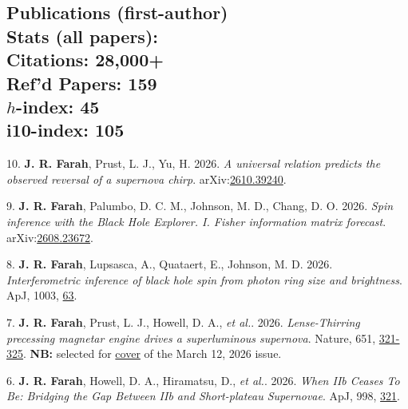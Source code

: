 \documentclass[margin,line]{res}
\newcommand{\statcites}{28{,}000+}
\newcommand{\statrefd}{159}
\newcommand{\stath}{45}
\newcommand{\stati}{105}
\begin{document}
\begin{resume}
\vspace{+.8cm}
\section{{\sc Publications (first-author)  \\ \vspace{0.3cm} {\footnotesize \textbf{\color{Maroon} Stats (all papers)}: \\Citations: \statcites \\ \vspace{0.1cm} \noindent Ref'd Papers: \statrefd \vspace{0.1cm} \\ $h$-index: \stath \\ i10-index: \stati}} \\ }


10. \textbf{J. R. Farah}, Prust, L. J., Yu, H. 2026. \textit{A universal relation predicts the observed reversal of a supernova chirp}. arXiv:\href{https://arxiv.org/abs/2610.39240}{2610.39240}.

9. \textbf{J. R. Farah}, Palumbo, D. C. M., Johnson, M. D., Chang, D. O. 2026. \textit{Spin inference with the Black Hole Explorer. I. Fisher information matrix forecast}. arXiv:\href{https://arxiv.org/abs/2608.23672v1}{2608.23672}.

8. \textbf{J. R. Farah}, Lupsasca, A., Quataert, E., Johnson, M. D. 2026. \textit{Interferometric inference of black hole spin from photon ring size and brightness}. ApJ, 1003, \href{https://iopscience.iop.org/article/10.3847/1538-4357/ae6116}{63}. 

7. \textbf{J. R. Farah}, Prust, L. J., Howell, D. A., \textit{et al.}. 2026. \textit{Lense-Thirring precessing magnetar engine drives a superluminous supernova}. Nature, 651, \href{https://www.nature.com/nature/volumes/651/issues/8105}{321-325}. \textbf{NB:} selected for \href{https://www.nature.com/nature/volumes/651/issues/8105}{cover} of the March 12, 2026 issue. 

6. \textbf{J. R. Farah}, Howell, D. A., Hiramatsu, D., \textit{et al.}. 2026. \textit{When IIb Ceases To Be: Bridging the Gap Between IIb and Short-plateau Supernovae}. ApJ, 998, \href{https://iopscience.iop.org/article/10.3847/1538-4357/ae3a71}{321}. 


\end{resume}
\end{document}
